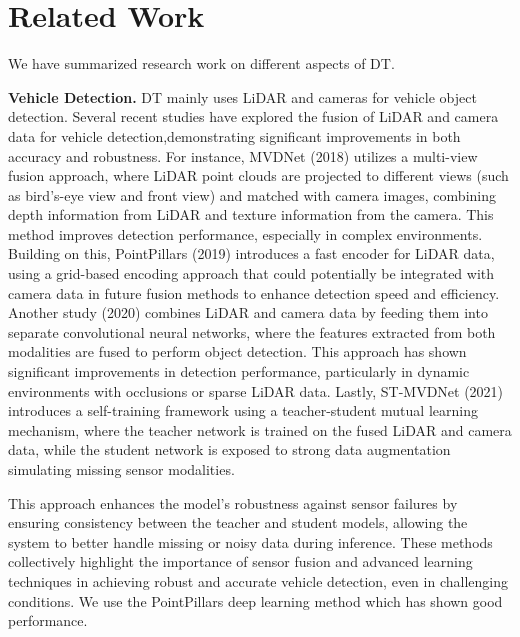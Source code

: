 \section{Related Work}
\label{sec:formatting}

We have summarized research work on different aspects of DT.

\textbf{Vehicle Detection.}
DT mainly uses LiDAR and cameras for vehicle object detection.
Several recent studies have explored the fusion of LiDAR and camera data for vehicle detection,demonstrating significant improvements in both accuracy and robustness. 
For instance, MVDNet (2018) utilizes a multi-view fusion approach, where LiDAR point clouds are projected to different views (such as bird’s-eye view and front view) and matched with camera images, combining depth information from LiDAR and texture information from the camera. 
This method improves detection performance, especially in complex environments. 
Building on this, PointPillars (2019) introduces a fast encoder for LiDAR data, using a grid-based encoding approach that could potentially be integrated with camera data in future fusion methods to enhance detection speed and efficiency.
Another study (2020) combines LiDAR and camera data by feeding them into separate convolutional neural networks, where the features extracted from both modalities are fused to perform object detection. 
This approach has shown significant improvements in detection performance, particularly in dynamic environments with occlusions or sparse LiDAR data.
Lastly, ST-MVDNet (2021) introduces a self-training framework using a teacher-student mutual learning mechanism, where the teacher network is trained on the fused LiDAR and camera data, while the student network is exposed to strong data augmentation simulating missing sensor modalities. 

This approach enhances the model’s robustness against sensor failures by ensuring consistency between the teacher and student models, allowing the system to better handle missing or noisy data during inference.
These methods collectively highlight the importance of sensor fusion and advanced learning techniques in achieving robust and accurate vehicle detection, even in challenging conditions.
We use the PointPillars deep learning method which has shown good performance.

